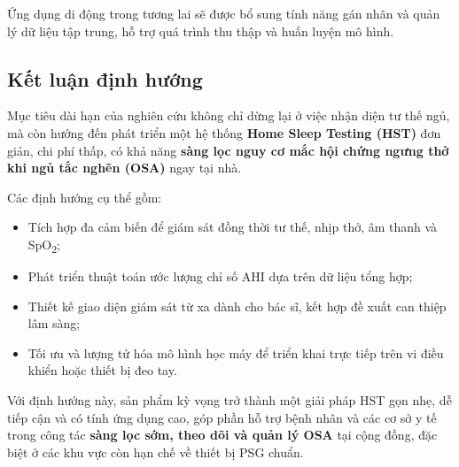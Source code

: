 Ứng dụng di động trong tương lai sẽ được bổ sung tính năng gán nhãn và quản lý dữ liệu tập trung, hỗ trợ quá trình thu thập và huấn luyện mô hình.

\subsection*{Kết luận định hướng}

Mục tiêu dài hạn của nghiên cứu không chỉ dừng lại ở việc nhận diện tư thế ngủ, mà còn hướng đến phát triển một hệ thống \textbf{Home Sleep Testing (HST)} đơn giản, chi phí thấp, có khả năng \textbf{sàng lọc nguy cơ mắc hội chứng ngưng thở khi ngủ tắc nghẽn (OSA)} ngay tại nhà.

Các định hướng cụ thể gồm:
\begin{itemize}
    \item Tích hợp đa cảm biến để giám sát đồng thời tư thế, nhịp thở, âm thanh và SpO\textsubscript{2};
    \item Phát triển thuật toán ước lượng chỉ số AHI dựa trên dữ liệu tổng hợp;
    \item Thiết kế giao diện giám sát từ xa dành cho bác sĩ, kết hợp đề xuất can thiệp lâm sàng;
    \item Tối ưu và lượng tử hóa mô hình học máy để triển khai trực tiếp trên vi điều khiển hoặc thiết bị đeo tay.
\end{itemize}

Với định hướng này, sản phẩm kỳ vọng trở thành một giải pháp HST gọn nhẹ, dễ tiếp cận và có tính ứng dụng cao, góp phần hỗ trợ bệnh nhân và các cơ sở y tế trong công tác \textbf{sàng lọc sớm, theo dõi và quản lý OSA} tại cộng đồng, đặc biệt ở các khu vực còn hạn chế về thiết bị PSG chuẩn.
